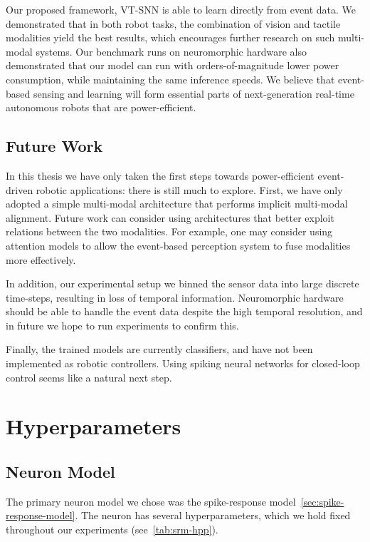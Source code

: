 \documentclass[fyp]{socreport}
\begin{document}
Our proposed framework, VT-SNN is able to learn directly from event data. We
demonstrated that in both robot tasks, the combination of vision and tactile
modalities yield the best results, which encourages further research on such
multi-modal systems. Our benchmark runs on neuromorphic hardware also
demonstrated that our model can run with orders-of-magnitude lower power
consumption, while maintaining the same inference speeds. We believe that
event-based sensing and learning will form essential parts of next-generation
real-time autonomous robots that are power-efficient.

\section{Future Work}
In this thesis we have only taken the first steps towards power-efficient
event-driven robotic applications: there is still much to explore. First, we
have only adopted a simple multi-modal architecture that performs implicit
multi-modal alignment. Future work can consider using architectures that better
exploit relations between the two modalities. For example, one may consider
using attention models to allow the event-based perception system to fuse
modalities more effectively.

In addition, our experimental setup we binned the sensor data into large
discrete time-steps, resulting in loss of temporal information. Neuromorphic
hardware should be able to handle the event data despite the high temporal
resolution, and in future we hope to run experiments to confirm this.

Finally, the trained models are currently classifiers, and have not been
implemented as robotic controllers. Using spiking neural networks for
closed-loop control seems like a natural next step.

\printbibliography
\appendix

\chapter{Hyperparameters\label{cha:hyperparameters}}

\section{Neuron Model}
The primary neuron model we chose was the spike-response
model~\autoref{sec:spike-response-model}. The neuron has several
hyperparameters, which we hold fixed throughout our experiments
(see~\autoref{tab:srm-hpp}).
\end{document}
